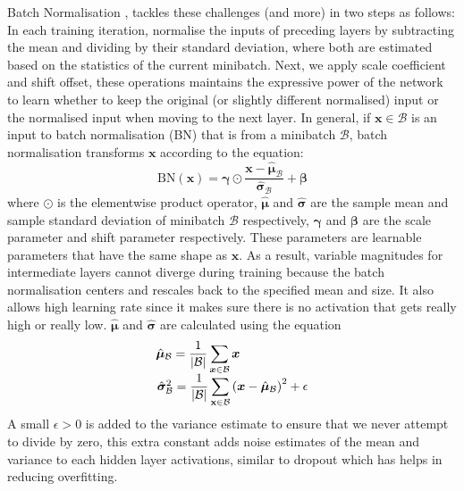 \documentclass[12pt]{report}
\numberwithin{equation}{section}
\begin{document}
Batch Normalisation \textbf{\cite{ioffe15}}, tackles these challenges (and more) in two steps as follows: In each training iteration, normalise the inputs of preceding layers by subtracting the mean and dividing by their standard deviation, where both are estimated based on the statistics of the current minibatch. Next, we apply scale coefficient and shift offset, these operations maintains the expressive power of the network to learn whether to keep the original (or slightly different normalised) input or the normalised input when moving to the next layer. In general, if $\bm{x} \in \mathcal{B}$ is an input to batch normalisation (BN) that is from a minibatch $\mathcal{B}$, batch normalisation transforms $\bm{x}$ according to the equation:
\begin{equation} \label{eqn:batch_norm}
\mathrm{BN}(\bm{x})= \boldsymbol{\gamma} \odot \frac{\bm{x}-\hat{\boldsymbol{\mu}}_{\mathcal{B}}}{\hat{\boldsymbol{\sigma}}_{\mathcal{B}}}+\boldsymbol{\beta}
\end{equation} \noindent
where $\odot$ is the elementwise product operator, $\hat{\boldsymbol{\mu}}$ and $\hat{\boldsymbol{\sigma}}$ are the sample mean and sample standard deviation of minibatch $\mathcal{B}$ respectively, $\boldsymbol{\gamma}$ and $\boldsymbol{\beta}$ are the scale parameter and shift parameter respectively. These parameters are learnable parameters that have the same shape as $\bm{x}$. As a result, variable magnitudes for intermediate layers cannot diverge during training because the batch normalisation centers and rescales back to the specified mean and size. It also allows high learning rate since it makes sure there is no activation that gets really high or really low. $\hat{\boldsymbol{\mu}}$ and $\hat{\boldsymbol{\sigma}}$ are calculated using the equation
\begin{equation}\label{eqn:mean_variance}
\begin{array}{l}
\hat{\boldsymbol{\mu}}_{\mathcal{B}} = \displaystyle \frac{1}{|\mathcal{B}|} \sum_{\bm{x} \in \mathcal{B}} \bm{x} \\
\hskip 1pt
\hat{\boldsymbol{\sigma}}_{\mathcal{B}}^{2} = \displaystyle \frac{1}{|\mathcal{B}|} \sum_{\mathbf{x} \in \mathcal{B}}\left(\bm{x}-\hat{\boldsymbol{\mu}}_{\mathcal{B}}\right)^{2}+\epsilon
\end{array}
\end{equation} \noindent
A small $\epsilon > 0$ is added to the variance estimate to ensure that we never attempt to divide by zero, this extra constant adds noise estimates of the mean and variance to each hidden layer activations, similar to dropout which has helps in reducing overfitting. 
\end{document}
